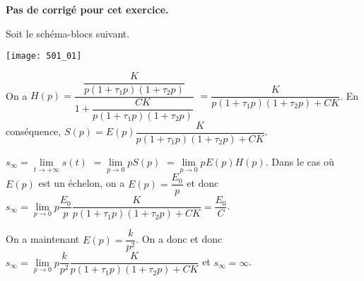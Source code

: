 \normaltrue \difficilefalse \tdifficilefalse
\correctiontrue


\setcounter{question}{0}

\ifcorrection
\else
\textbf{Pas de corrigé pour cet exercice.}
\fi


\ifprof 
\else
Soit le schéma-blocs suivant.
\begin{center}
\texttt{[image: 501\_01]}
\end{center}
 \fi
 
\ifprof
On a 
$H(p)=\dfrac{\dfrac{K}{p\left(1+\tau_1 p \right)\left(1+\tau_2 p \right)}}{1+\dfrac{CK}{p\left(1+\tau_1 p \right)\left(1+\tau_2 p \right)}}$
$=\dfrac{K}{p\left(1+\tau_1 p \right)\left(1+\tau_2 p \right)+CK}$. 
En conséquence, $S(p)=E(p)\dfrac{K}{p\left(1+\tau_1 p \right)\left(1+\tau_2 p \right)+CK}$.

$s_{\infty}=\lim\limits_{t\to +\infty} s(t)$ $=\lim\limits_{p\to 0} pS(p)$
$=\lim\limits_{p\to 0} pE(p)H(p)$.
Dans le cas où $E(p)$ est un échelon, on a $E(p)=\dfrac{E_0}{p}$ et donc 
$s_{\infty}=\lim\limits_{p\to 0} p\dfrac{E_0}{p}\dfrac{K}{p\left(1+\tau_1 p \right)\left(1+\tau_2 p \right)+CK}=\dfrac{E_0}{C}$.
\else 
\fi


\ifprof
On a maintenant $E(p)=\dfrac{k}{p^2}$. 
On a donc et donc 
$s_{\infty}=\lim\limits_{p\to 0} p\dfrac{k}{p^2}\dfrac{K}{p\left(1+\tau_1 p \right)\left(1+\tau_2 p \right)+CK}$ et 
$s_{\infty}=\infty$.

\else 
\fi


%
%


